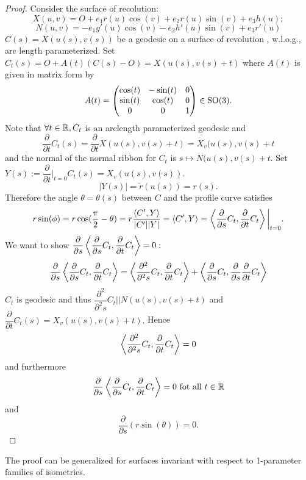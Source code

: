 \begin{proof}Consider the surface of recolution:
		$$ X(u,v) = O +  e_1r(u)\cos(v) + e_2r(u)\sin(v) + e_3h(u); $$
	$$ N(u,v) = -e_1g'(u)\cos(v) - e_2h'(u)\sin(v) +e_3r'(u) $$
	$ C(s) = X(u(s),v(s))$ be a geodesic on a surface of revolution , w.l.o.g., arc length parameterized.
	Set $ C_t(s) = O + A(t)(C(s)-O) = X(u(s),v(s)+t) $ where $ A(t) $ is given in matrix form by
		\[ A(t) = \begin{pmatrix} \cos(t) & -\sin(t) & 0 \\ \sin(t) & \cos(t) & 0 \\ 0 & 0 & 1  \end{pmatrix} \in \mathrm{SO}(3). \]
	Note that $ \forall t \in \mathbb R, C_t$ is an arclength parameterized geodesic and
			\[ \dfrac{\partial}{\partial t} C_t(s) = \dfrac{\partial}{\partial t}X(u(s),v(s)+t) = X_v(u(s),v(s)+t \] and the normal of the normal ribbon for $ C_t $ is $ s \mapsto N(u(s),v(s)+t $.
	Set $ Y(s) := \dfrac{\partial}{\partial t}\big|_{t=0}C_t(s) = X_v(u(s),v(s)). $
	\[|Y(s)| = \widetilde{r}(u(s)) = r(s). \] 
	Therefore the angle $ \theta = \theta(s) $ between $ C $ and the profile curve satisfies
		\[ r\sin(\phi) = r \cos(\dfrac{\pi}{2} - \theta) = r\dfrac{\left \langle C',Y \right\rangle}{|C'||Y|}= \left \langle C',Y \right\rangle = \left \langle \dfrac{\partial}{\partial s}C_t,\dfrac{\partial}{\partial t}C_t \right\rangle\bigg|_{t=0}. \]
	We want to show $ \dfrac{\partial}{\partial s} \left \langle  \dfrac{\partial}{\partial s} C_t , \dfrac{\partial}{\partial t} C_t  \right\rangle = 0: $
		\[ \dfrac{\partial}{\partial s} \left \langle  \dfrac{\partial}{\partial s} C_t , \dfrac{\partial}{\partial t} C_t  \right\rangle = \left \langle  \dfrac{\partial^2}{\partial^2 s} C_t , \dfrac{\partial}{\partial t} C_t \right\rangle + \left \langle  \dfrac{\partial}{\partial s} C_t , \dfrac{\partial}{\partial s} \dfrac{\partial}{\partial t} C_t  \right\rangle \]
	$ C_t $ is geodesic and thus $ \dfrac{\partial^2}{\partial^2s} C_t || N(u(s),v(s)+t) $ and $ \dfrac{\partial}{\partial t} C_t(s)=X_v(u(s),v(s)+t). $ 
	Hence
		\[ \left \langle  \dfrac{\partial^2}{\partial^2 s} C_t , \dfrac{\partial}{\partial t} C_t  \right\rangle = 0 \] 
	and furthermore
		\[ \dfrac{\partial}{\partial s} \left \langle  \dfrac{\partial}{\partial s} C_t , \dfrac{\partial}{\partial t} C_t  \right\rangle = 0 \text{ fot all $t \in \mathbb R$} \] 
	and
		\[ \dfrac{\partial}{\partial s}(r \sin(\theta)) = 0. \]
\end{proof}

\begin{remark}
	
	The proof can be generalized for surfaces invariant with respect to 1-parameter families of isometries.
	
\end{remark}

